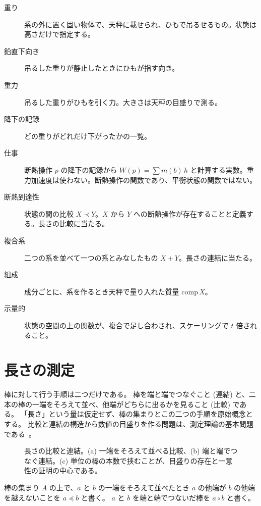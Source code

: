 \begin{description}
  \item[重り] 系の外に置く固い物体で、天秤に載せられ、ひもで吊るせるもの。状態は高さだけで指定する。
  \item[鉛直下向き] 吊るした重りが静止したときにひもが指す向き。
  \item[重力] 吊るした重りがひもを引く力。大きさは天秤の目盛りで測る。
  \item[降下の記録] どの重りがどれだけ下がったかの一覧。
  \item[仕事] 断熱操作 $p$ の降下の記録から $W(p) = \sum m(b)\, h$ と計算する実数。重力加速度は使わない。断熱操作の関数であり、平衡状態の関数ではない。
  \item[断熱到達性] 状態の間の比較 $X \prec Y$。$X$ から $Y$ への断熱操作が存在することと定義する。長さの比較に当たる。
  \item[複合系] 二つの系を並べて一つの系とみなしたもの $X + Y$。長さの連結に当たる。
  \item[組成] 成分ごとに、系を作るとき天秤で量り入れた質量 $\mathrm{comp}\, X$。
  \item[示量的] 状態の空間の上の関数が、複合で足し合わされ、スケーリングで $t$ 倍されること。
\end{description}

\chapter{長さの測定}

棒に対して行う手順は二つだけである。
棒を端と端でつなぐこと (連結) と、二本の棒の一端をそろえて並べ、他端がどちらに出るかを見ること (比較) である。
「長さ」という量は仮定せず、棒の集まりとこの二つの手順を原始概念とする。
比較と連結の構造から数値の目盛りを作る問題は、測定理論の基本問題である~\cite{Holder1901,KLST1971}。

\begin{figure}[htbp]
  \centering
  \caption{長さの比較と連結。(a) 一端をそろえて並べる比較、(b) 端と端でつなぐ連結。(c) 単位の棒の本数で挟むことが、目盛りの存在と一意性の証明の中心である。}
  \label{fig:length}
\end{figure}

\begin{definition}[比較と連結]
  \label{def:compare-concat}
  \leanok
  棒の集まり $A$ の上で、$a$ と $b$ の一端をそろえて並べたとき $a$ の他端が $b$ の他端を越えないことを $a \preceq b$ と書く。
  $a$ と $b$ を端と端でつないだ棒を $a \circ b$ と書く。
\end{definition}


